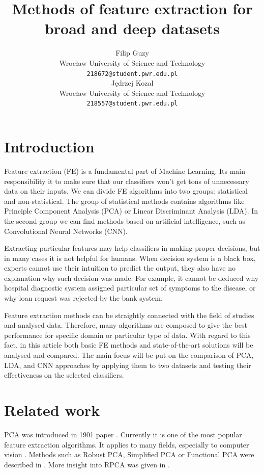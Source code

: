 \documentclass[a4paper, 10 pt, conference]{ieeeconf}
\title{\LARGE \bf
Methods of feature extraction for broad and deep datasets
}
\author{ \parbox{2 in}{\centering Filip Guzy \\
        Wrocław University of Science and Technology\\
        {\tt\small 218672@student.pwr.edu.pl}}
        \hspace*{ 0.3 in}
        \parbox{2 in}{\centering Jędrzej Kozal \\
        Wrocław University of Science and Technology\\
        {\tt\small 218557@student.pwr.edu.pl}}
}
\begin{document}
\maketitle
\thispagestyle{empty}
\pagestyle{empty}

\begin{abstract}

\end{abstract}

\section{Introduction}

Feature extraction (FE) is a fundamental part of Machine Learning. Its main responsibility it to make sure that our classifiers won't get tons of unnecessary data on their inputs. We can divide FE algorithms into two groups: statistical and non-statistical. The group of statistical methods contains algorithms like Principle Component Analysis (PCA) or Linear Discriminant Analysis (LDA). In the second group we can find methods based on artificial intelligence, such as Convolutional Neural Networks (CNN). 

Extracting particular features may help classifiers in making proper decisions, but in many cases it is not helpful for humans. When decision system is a black box, experts cannot use their intuition to predict the output, they also have no explanation why such decision was made. For example, it cannot be deduced why hospital diagnostic system assigned particular set of symptoms to the disease, or why loan request was rejected by the bank system.

Feature extraction methods can be straightly connected with the field of studies and analysed data. Therefore, many algorithms are composed to give the best performance for specific domain or particular type of data. With regard to this fact, in this article both basic FE methods and state-of-the-art solutions will be analysed and compared. The main focus will be put on the comparison of PCA, LDA, and CNN approaches by applying them to two datasets and testing their effectiveness on the selected classifiers.

\section{Related work}
PCA was introduced in 1901 paper \cite{PCA}. Currently it is one of the most popular feature extraction algorithms. It applies to many fields, especially to computer vision \cite{PCA_book}. Methods such as Robust PCA, Simplified PCA or Functional PCA were described in \cite{PCA_recent}. More insight into RPCA was given in \cite{RPCA}.
\end{document}
